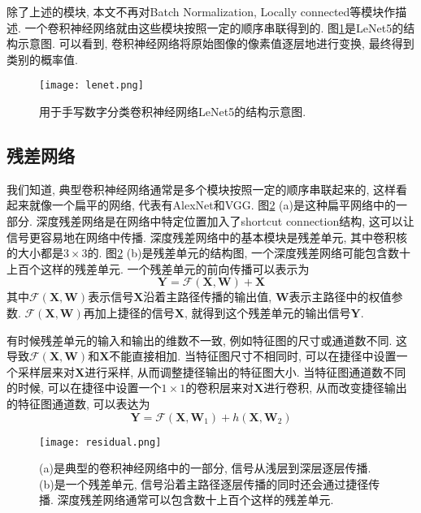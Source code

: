 除了上述的模块, 本文不再对Batch Normalization, Locally connected等模块作描述. 一个卷积神经网络就由这些模块按照一定的顺序串联得到的. 图\ref{lenet}是LeNet5\cite{Lecun1998GradientbasedLA}的结构示意图. 可以看到, 卷积神经网络将原始图像的像素值逐层地进行变换, 最终得到类别的概率值.
\begin{figure}[!htbp]
\centering
\texttt{[image: lenet.png]}
\caption{用于手写数字分类卷积神经网络LeNet5的结构示意图.}
\label{lenet} 
\end{figure}

\subsection{残差网络}
我们知道, 典型卷积神经网络通常是多个模块按照一定的顺序串联起来的, 这样看起来就像一个扁平的网络, 代表有AlexNet和VGG\cite{Krizhevsky2012ImageNetCW,Simonyan2014VeryDC}. 图\ref{residual} (a)是这种扁平网络中的一部分. 深度残差网络\cite{He2016DeepRL,He2016IdentityMI}是在网络中特定位置加入了shortcut connection结构, 这可以让信号更容易地在网络中传播. 深度残差网络中的基本模块是残差单元, 其中卷积核的大小都是$3\times3$的. 图\ref{residual} (b)是残差单元的结构图, 一个深度残差网络可能包含数十上百个这样的残差单元. 一个残差单元的前向传播可以表示为
\begin{equation}
    \boldsymbol{Y} = \mathcal{F}(\boldsymbol{X}, \boldsymbol{W}) + \boldsymbol{X}
\end{equation}
其中$\mathcal{F}(\boldsymbol{X}, \boldsymbol{W})$表示信号$\boldsymbol{X}$沿着主路径传播的输出值, $\boldsymbol{W}$表示主路径中的权值参数. $\mathcal{F}(\boldsymbol{X}, \boldsymbol{W})$再加上捷径的信号$\boldsymbol{X}$, 就得到这个残差单元的输出信号$\boldsymbol{Y}$.

有时候残差单元的输入和输出的维数不一致, 例如特征图的尺寸或通道数不同. 这导致$\mathcal{F}(\boldsymbol{X}, \boldsymbol{W})$和$\boldsymbol{X}$不能直接相加. 当特征图尺寸不相同时, 可以在捷径中设置一个采样层来对$\boldsymbol{X}$进行采样, 从而调整捷径输出的特征图大小. 当特征图通道数不同的时候, 可以在捷径中设置一个$1\times1$的卷积层来对$\boldsymbol{X}$进行卷积, 从而改变捷径输出的特征图通道数, 可以表达为
\begin{equation}
  \boldsymbol{Y} = \mathcal{F}(\boldsymbol{X}, \boldsymbol{W}_1) + h(\boldsymbol{X}, \boldsymbol{W}_2)
\end{equation}

\begin{figure}[!htbp]
\centering
\texttt{[image: residual.png]}
\caption{(a)是典型的卷积神经网络中的一部分, 信号从浅层到深层逐层传播. (b)是一个残差单元, 信号沿着主路径逐层传播的同时还会通过捷径传播. 深度残差网络通常可以包含数十上百个这样的残差单元.}
\label{residual} 
\end{figure}


